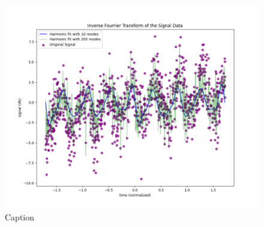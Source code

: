 \documentclass{article}
\begin{document}
\begin{figure}[h]
    \centering
    \includegraphics[width=0.8\linewidth]{ps5_figs/3e.png}
    \caption{Caption}
    \label{fig:enter-label}
\end{figure}
\end{document}
